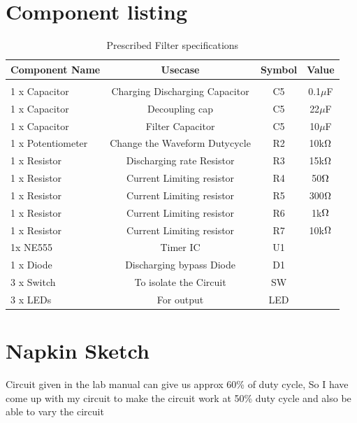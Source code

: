 \documentclass[a4paper,11pt]{article}%
\begin{document}
\section{Component listing}


\begin{table}[!h]
	\centering

	\begin{tabular}{l c c c}
		\hline
		\textbf{Component Name}&\textbf{Usecase}&\textbf{Symbol}&\textbf{Value}\\\hline
		&&\\
1 x Capacitor&Charging Discharging Capacitor&C5&0.1$\mu$F\\
1 x Capacitor&Decoupling cap&C5&22$\mu$F\\
1 x Capacitor&Filter Capacitor&C5&10$\mu$F\\
1 x Potentiometer&Change the Waveform Dutycycle&R2&10k$\ohm$\\
1 x Resistor&Discharging rate Resistor&R3&15k$\ohm$\\
1 x Resistor&Current Limiting resistor&R4&50$\ohm$\\
1 x Resistor&Current Limiting resistor&R5&300$\ohm$\\
1 x Resistor&Current Limiting resistor&R6&1k$\ohm$\\
1 x Resistor&Current Limiting resistor&R7&10k$\ohm$\\
1x NE555&Timer IC&U1\\
1 x Diode&Discharging bypass Diode&D1\\
3 x Switch&To isolate the Circuit&SW\\
3 x LEDs&For output&LED\\
\hline\hline
	\end{tabular}
	\caption{Prescribed Filter specifications}
	\label{filterspecs}
\end{table}



\section{Napkin Sketch}

Circuit given in the lab manual can give us approx 60\% 
of duty cycle, So I have come up with my circuit to make the circuit work at 50\% duty cycle and also be able to vary the circuit
\end{document}
